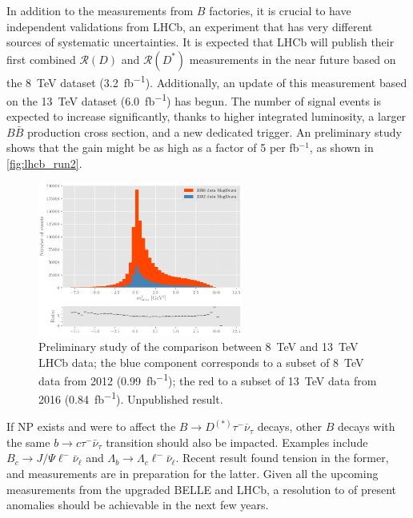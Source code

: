 \documentclass[12pt,letterpaper]{article}
\newcommand{\PRLrule}{
    \bigskip
    \noindent\makebox[\linewidth]{
        \resizebox{0.3333\linewidth}{1pt}{$\blacklozenge$}
    }
    \bigskip
}
\def\RD/{\ensuremath{\mathcal{R}(D)}}
\def\RDst/{\ensuremath{\mathcal{R}(D^{*})}}
\def\DDst/{\ensuremath{D^{(*)}}}
\newcommand{\BMesonMode}[2]{\ensuremath{
    B \rightarrow #2 #1^- \overline{\nu}_#1
}}
\newcommand{\BDDstMode}[1]{\BMesonMode{#1}{\DDst/}}
\begin{document}
In addition to the measurements from $B$ factories, it is crucial to have
independent validations from LHCb, an experiment that has very different sources
of systematic uncertainties.
It is expected that LHCb will publish their first combined \RD/ and \RDst/
measurements in the near future based on the \SI{8}{TeV} dataset
(\SI{3.2}{fb^{-1}}).
Additionally, an update of this measurement based on the \SI{13}{TeV} dataset
(\SI{6.0}{fb^{-1}}) has begun.
The number of signal events is expected to increase significantly, thanks to
higher integrated luminosity, a larger $B \bar{B}$ production cross section, and
a new dedicated trigger.
An preliminary study shows that the gain might be as high as a factor of 5 per
fb$^{-1}$, as shown in \autoref{fig:lhcb_run2}.

\begin{figure}[ht]
    \centering
    \includegraphics[width=0.6\textwidth]{figs/lhcb_run2.pdf}
    \caption{
        Preliminary study of the comparison between \SI{8}{TeV} and \SI{13}{TeV}
        LHCb data;
        the blue component corresponds to a subset of \SI{8}{TeV} data from 2012
        (\SI{0.99}{fb^{-1}});
        the red to a subset of \SI{13}{TeV} data from 2016 (\SI{0.84}{fb^{-1}}).
        Unpublished result.
    }
    \label{fig:lhcb_run2}
\end{figure}

If NP exists and were to affect the \BDDstMode{\tau} decays, other $B$ decays
with the same $b \rightarrow c \tau^- \bar{\nu}_\tau$ transition should also be
impacted.
Examples include $B_c \rightarrow J/\Psi \ell^- \bar{\nu}_\ell$ and
$\Lambda_b \rightarrow \Lambda_c \ell^- \bar{\nu}_\ell$.
Recent result \cite{Aaij:2017tyk} found tension in the former, and measurements
are in preparation for the latter.
Given all the upcoming measurements from the upgraded BELLE and LHCb, a
resolution to of present anomalies should be achievable in the next few years.

\FloatBarrier
\PRLrule
\printbibliography
\end{document}
